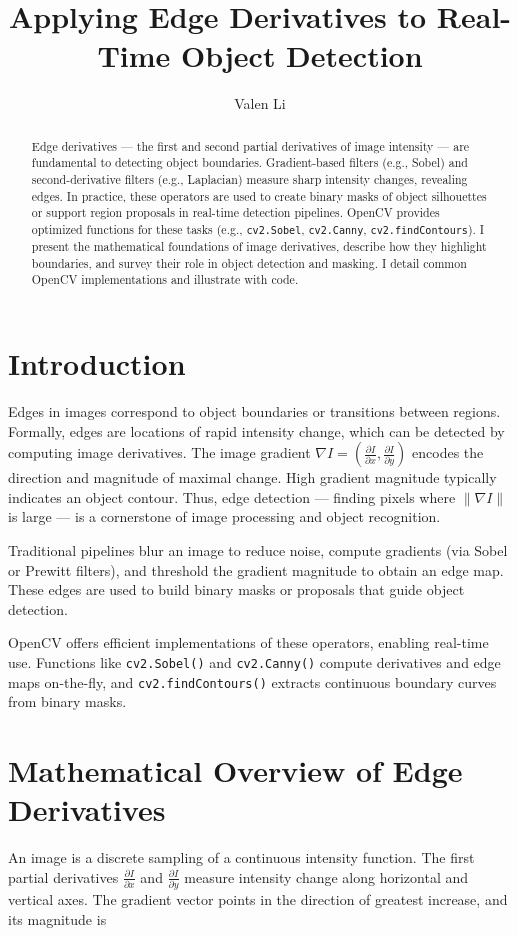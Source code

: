\documentclass[12pt]{article}
\title{Applying Edge Derivatives to Real-Time Object Detection}
\author{Valen Li}
\date{}
\begin{document}
\maketitle

\begin{abstract}
Edge derivatives --- the first and second partial derivatives of image intensity --- are fundamental to detecting object boundaries. Gradient-based filters (e.g., Sobel) and second-derivative filters (e.g., Laplacian) measure sharp intensity changes, revealing edges. In practice, these operators are used to create binary masks of object silhouettes or support region proposals in real-time detection pipelines. OpenCV provides optimized functions for these tasks (e.g., \texttt{cv2.Sobel}, \texttt{cv2.Canny}, \texttt{cv2.findContours}). I present the mathematical foundations of image derivatives, describe how they highlight boundaries, and survey their role in object detection and masking. I detail common OpenCV implementations and illustrate with code. 
\end{abstract}

\section{Introduction}
Edges in images correspond to object boundaries or transitions between regions. Formally, edges are locations of rapid intensity change, which can be detected by computing image derivatives. The image gradient \( \nabla I = \left( \frac{\partial I}{\partial x}, \frac{\partial I}{\partial y} \right) \) encodes the direction and magnitude of maximal change. High gradient magnitude typically indicates an object contour. Thus, edge detection --- finding pixels where \( \|\nabla I\| \) is large --- is a cornerstone of image processing and object recognition.

Traditional pipelines blur an image to reduce noise, compute gradients (via Sobel or Prewitt filters), and threshold the gradient magnitude to obtain an edge map. These edges are used to build binary masks or proposals that guide object detection.

OpenCV offers efficient implementations of these operators, enabling real-time use. Functions like \texttt{cv2.Sobel()} and \texttt{cv2.Canny()} compute derivatives and edge maps on-the-fly, and \texttt{cv2.findContours()} extracts continuous boundary curves from binary masks. 

\section{Mathematical Overview of Edge Derivatives}
An image is a discrete sampling of a continuous intensity function. The first partial derivatives \( \frac{\partial I}{\partial x} \) and \( \frac{\partial I}{\partial y} \) measure intensity change along horizontal and vertical axes. The gradient vector points in the direction of greatest increase, and its magnitude is
\end{document}
